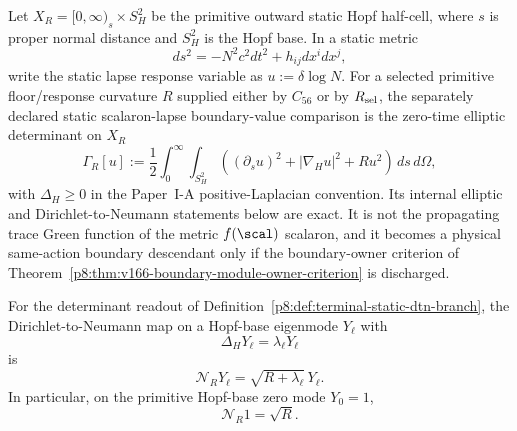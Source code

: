 \documentclass[12pt,a4paper]{article}
\begin{document}
\begin{definition}
\label{p8:def:terminal-static-dtn-branch}
Let \(X_R=[0,\infty)_s\times S^2_H\) be the primitive outward static Hopf half-cell, where \(s\) is proper normal distance and \(S^2_H\) is the Hopf base.  In a static metric
\begin{equation}
 ds^2=-N^2c^2dt^2+h_{ij}dx^idx^j,
\end{equation}
write the static lapse response variable as \(u:=\delta\log N\).  For a selected primitive floor/response curvature \(R\) supplied either by \(C_{56}\) or by \(R_{\rm sel}\), the separately declared static scalaron-lapse boundary-value comparison is the zero-time elliptic determinant on \(X_R\)
\begin{equation}
\label{p8:eq:terminal-static-dtn-action}
 \Gamma_R[u]
 :=\frac12\int_{0}^{\infty}\!\int_{S^2_H}
 \left((\partial_su)^2+|\nabla_Hu|^2+R u^2\right)
 \,ds\,d\Omega,
\end{equation}
with \(\Delta_H\ge0\) in the Paper~I-A positive-Laplacian convention.  Its
internal elliptic and Dirichlet-to-Neumann statements below are exact.  It is
not the propagating trace Green function of the metric \(f(\scal)\) scalaron,
and it becomes a physical same-action boundary descendant only if the
boundary-owner criterion of
Theorem~\ref{p8:thm:v166-boundary-module-owner-criterion} is discharged.
\end{definition}

\begin{lemma}
\label{p8:lem:static-dtn-sqrtR}
For the determinant readout of Definition~\ref{p8:def:terminal-static-dtn-branch}, the Dirichlet-to-Neumann map on a Hopf-base eigenmode \(Y_\ell\) with
\begin{equation}
 \Delta_HY_\ell=\lambda_\ell Y_\ell
\end{equation}
is
\begin{equation}
\label{p8:eq:dtn-full-spectrum}
 \mathcal N_RY_\ell=\sqrt{R+\lambda_\ell}\,Y_\ell .
\end{equation}
In particular, on the primitive Hopf-base zero mode \(Y_0=1\),
\begin{equation}
\label{p8:eq:dtn-zero-mode-sqrtR}
 \mathcal N_R1=\sqrt R .
\end{equation}
\end{lemma}
\end{document}

